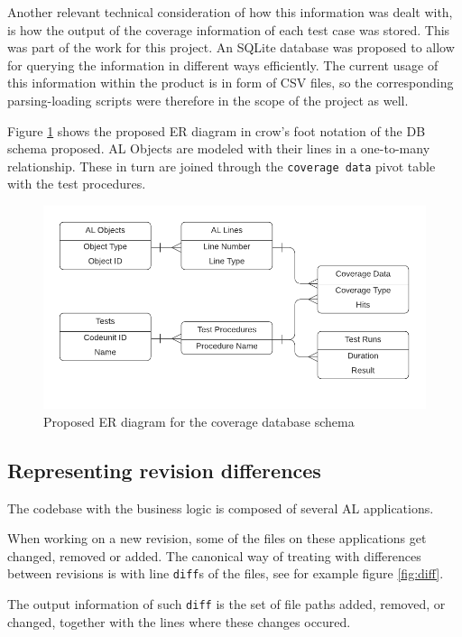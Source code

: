 \documentclass{article}
\begin{document}
Another relevant technical consideration of how this information was dealt with, is how the output of the coverage information of each test case was stored. This was part of the work for this project. An SQLite database was proposed to allow for querying the information in different ways efficiently. The current usage of this information within the product is in form of CSV files, so the corresponding parsing-loading scripts were therefore in the scope of the project as well.

Figure \ref{fig:erdiagram} shows the proposed ER diagram in crow's foot notation of the DB schema proposed. AL Objects are modeled with their lines in a one-to-many relationship. These in turn are joined through the \texttt{coverage data} pivot table with the test procedures.
\begin{figure}[H]
  \includegraphics[width=\textwidth]{images/erdiagram.png}
  \caption{Proposed ER diagram for the coverage database schema}\label{fig:erdiagram}
\end{figure}

\subsection{Representing revision differences}\label{section:rev-diffs}

The codebase with the business logic is composed of several AL applications.

When working on a new revision, some of the files on these applications get changed, removed or added. The canonical way of treating with differences between revisions is with line \texttt{diff}s of the files, see for example figure \ref{fig:diff}.

The output information of such \texttt{diff} is the set of file paths added, removed, or changed, together with the lines where these changes occured.
\end{document}
